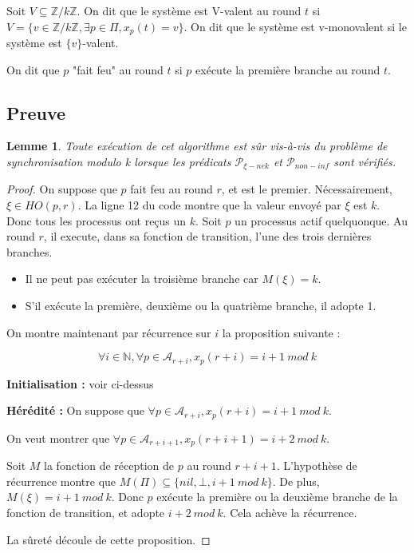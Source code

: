 \documentclass{article}
\newtheorem{lemma}{Lemme}[section]
\begin{document}
Soit $V \subseteq \mathds{Z}/k\mathds{Z}$. On dit que le système est V-valent au round $t$ si $V = \{v \in \mathds{Z}/k\mathds{Z}, \exists p \in \Pi, x_p(t) = v\}$.
On dit que le système est v-monovalent si le système est $\{v\}$-valent.

On dit que $p$ "fait feu" au round $t$ si $p$ exécute la première branche au round $t$.

\subsection{Preuve}

\begin{lemma}
	Toute exécution de cet algorithme est sûr vis-à-vis du problème de synchronisation modulo k lorsque les prédicats $\mathcal{P}_{\xi-nek}$ et $\mathcal{P}_{non-inf}$ sont vérifiés.
\end{lemma}
\begin{proof}

	On suppose que $p$ fait feu au round $r$, et est le premier. Nécessairement, $\xi \in HO(p,r)$.
	La ligne 12 du code montre que la valeur envoyé par $\xi$ est $k$.
	Donc tous les processus ont reçus un $k$. Soit $p$ un processus actif quelquonque. Au round $r$, il execute, dans sa fonction de transition, l'une des trois dernières branches.
	\begin{itemize}

		\item Il ne peut pas exécuter la troisième branche car $M(\xi) = k$.
		\item S'il exécute la première, deuxième ou la quatrième branche, il adopte 1.

	\end{itemize}

	On montre maintenant par récurrence sur $i$ la proposition suivante :

	$$\forall i \in \mathds{N}, \forall p \in \mathcal{A}_{r+i}, x_p(r+i) = i+1~mod~k$$

	\textbf{Initialisation : } voir ci-dessus

	\textbf{Hérédité :}
	On suppose que $\forall p \in \mathcal{A}_{r+i}, x_p(r+i) = i+1~mod~k$.

	On veut montrer que $\forall p \in \mathcal{A}_{r+i+1}, x_p(r+i+1) = i+2~mod~k$.

	Soit $M$ la fonction de réception de $p$ au round $r+i+1$.
	L'hypothèse de récurrence montre que $M(\Pi) \subseteq \{nil, \bot, i+1~mod~k\}$.
	De plus, $M(\xi) = i+1~mod~k$. Donc $p$ exécute la première ou la deuxième branche de la fonction de transition, et adopte $i+2~mod~k$.
	Cela achève la récurrence.

	La sûreté découle de cette proposition.

\end{proof}
\end{document}
